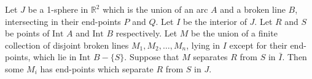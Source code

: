 Let $J$ be a 1-sphere in $\mathbb{R}^2$ which is the union of an arc $A$ and a broken line $B$, intersecting in their end-points $P$ and $Q$. Let $I$ be the interior of $J$. Let $R$ and $S$ be points of $\text{Int } A$ and $\text{Int } B$ respectively. Let $M$ be the union of a finite collection of disjoint broken lines $M_1, M_2, \ldots, M_n$, lying in $I$ except for their end-points, which lie in $\text{Int } B - \{S\}$. Suppose that $M$ separates $R$ from $S$ in $\bar{I}$. Then some $M_i$ has end-points which separate $R$ from $S$ in $J$.
